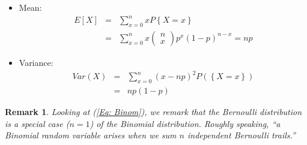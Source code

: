 \documentclass[smaller, handout]{beamer}\usepackage[]{graphicx}\usepackage[]{color}
\newtheorem{remark}{Remark}[section]
\renewcommand{\Pr}{P}
\newenvironment{stepitemize}{\begin{itemize}[<+->]}{\end{itemize} }
\begin{document}
\begin{frame}{\secname}%


\begin{stepitemize}
\item Mean:
\begin{eqnarray*}
E\left[ X\right] &=&\sum_{x=0}^{n}x\Pr \left\{ X=x\right\} \\
&=&\sum_{x=0}^{n}x\left(
\begin{array}{c}
n \\
x%
\end{array}%
\right) p^{x}\left( 1-p\right) ^{n-x} = np
\end{eqnarray*}

\item Variance:%
\begin{eqnarray*}
Var\left( X\right) &=&\sum_{x=0}^{n}\left( x-np\right) ^{2} P (\left\{
X=x\right\}) \\
&=&np\left( 1-p\right)
\end{eqnarray*}
\end{stepitemize}
\begin{remark}
Looking at (\ref{Eq: Binom}), we remark that the Bernoulli distribution is a special case ($n=1$)
of the Binomial distribution. Roughly speaking, ``a Binomial random variable arises when we sum $n$ independent
Bernoulli trails.''
\end{remark}
\end{frame}%

\end{document}
